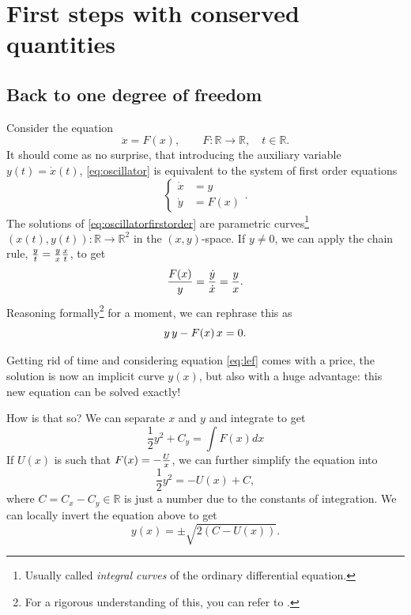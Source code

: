 \documentclass[english,fontsize=11pt,paper=a5,oneside]{scrbook}
\newcommand{\R}{\mathbb{R}}
\let\d\relax
\newcommand{\d}{\mathrm{d}}
\theoremstyle{definition}
\begin{document}
\section{First steps with conserved quantities}
\subsection{Back to one degree of freedom}\label{sec:bdf}

Consider the equation
\begin{equation}\label{eq:oscillator}
  \ddot x = F(x), \qquad F:\R\to\R, \quad t\in \R.
\end{equation}
It should come as no surprise, that introducing the auxiliary variable $y(t) = \dot x(t)$, \eqref{eq:oscillator} is equivalent to the system of first order equations
\begin{equation}\label{eq:oscillatorfirstorder}
  \left\lbrace
  \begin{aligned}
    \dot x & = y    \\
    \dot y & = F(x)
  \end{aligned}
  \right..
\end{equation}
The solutions of \eqref{eq:oscillatorfirstorder} are parametric curves\footnote{Usually called \emph{integral curves} of the ordinary differential equation.} $(x(t),y(t)):\R\to\R^2$ in the $(x,y)$-space.
%
If $y\neq0$, we can apply the chain rule, $\frac{\d y}{\d t} = \frac{\d y}{\d x} \frac{\d x}{\d t}$, to get
\begin{equation}\label{eq:lef}
  \frac{F(x)}y = \frac{\dot y}{\dot x} = \frac{\d y}{\d x}.
\end{equation}
Reasoning formally\footnote{For a rigorous understanding of this, you can refer to \cite[Equation (5.1) with $f=y$ and Remark 5.1.3]{lectures:aom:seri}.} for a moment, we can rephrase this as
\begin{equation}
  y\,\d y - F(x)\, \d x = 0.
\end{equation}

Getting rid of time and considering equation \eqref{eq:lef} comes with a price, the solution is now an implicit curve $y(x)$, but also with a huge advantage: this new equation can be solved exactly!

How is that so? We can separate $x$ and $y$ and integrate to get
\begin{equation}
  \frac12 y^2 + C_y = \int F(x) dx
\end{equation}
If $U(x)$ is such that $F(x) = -\frac{\d U}{\d x}$, we can further simplify the equation into
\begin{equation}
  \frac12 y^2 = -U(x) + C,
\end{equation}
where $C = C_x - C_y \in\R$ is just a number due to the constants of integration.
We can locally invert the equation above to get
\begin{equation}
  y(x) = \pm \sqrt{2(C-U(x))}.
\end{equation}
\end{document}
